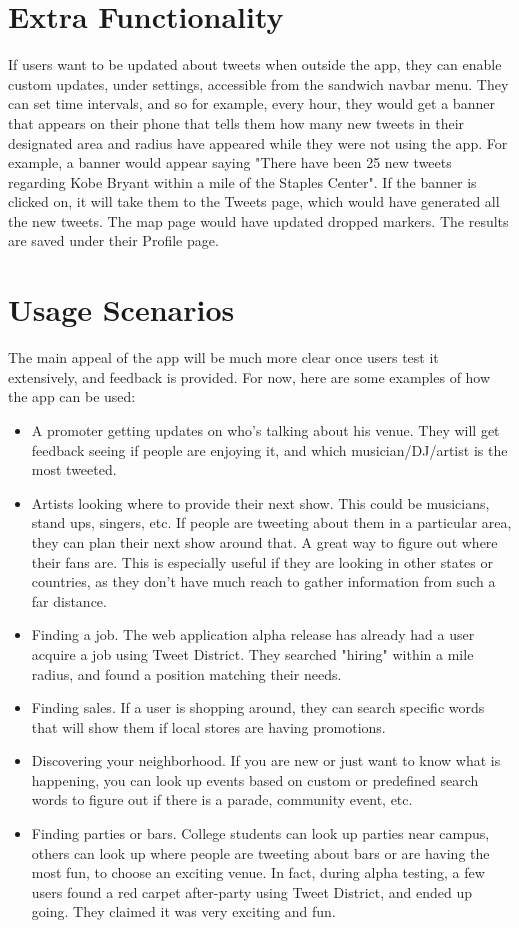 \documentclass[11pt]{article}
\begin{document}
\section{Extra Functionality}
If users want to be updated about tweets when outside the app, they can enable custom updates, under settings, accessible from the sandwich navbar menu. They can set time intervals, and so for example, every hour, they would get a banner that appears on their phone that tells them how many new tweets in their designated area and radius have appeared while they were not using the app. For example, a banner would appear saying "There have been 25 new tweets regarding Kobe Bryant within a mile of the Staples Center". If the banner is clicked on, it will take them to the Tweets page, which would have generated all the new tweets. The map page would have updated dropped markers. The results are saved under their Profile page.

\section{Usage Scenarios}
The main appeal of the app will be much more clear once users test it extensively, and feedback is provided. For now, here are some examples of how the app can be used:

\begin{itemize}
\item A promoter getting updates on who's talking about his venue. They will get feedback seeing if people are enjoying it, and which musician/DJ/artist is the most tweeted.
\item Artists looking where to provide their next show. This could be musicians, stand ups, singers, etc. If people are tweeting about them in a particular area, they can plan their next show around that. A great way to figure out where their fans are. This is especially useful if they are looking in other states or countries, as they don't have much reach to gather information from such a far distance.
\item Finding a job. The web application alpha release has already had a user acquire a job using Tweet District. They searched "hiring" within a mile radius, and found a position matching their needs.
\item Finding sales. If a user is shopping around, they can search specific words that will show them if local stores are having promotions.
\item Discovering your neighborhood. If you are new or just want to know what is happening, you can look up events based on custom or predefined search words to figure out if there is a parade, community event, etc.
\item Finding parties or bars. College students can look up parties near campus, others can look up where people are tweeting about bars or are having the most fun, to choose an exciting venue. In fact, during alpha testing, a few users found a red carpet after-party using Tweet District, and ended up going. They claimed it was very exciting and fun.
\end{itemize}
\end{document}
